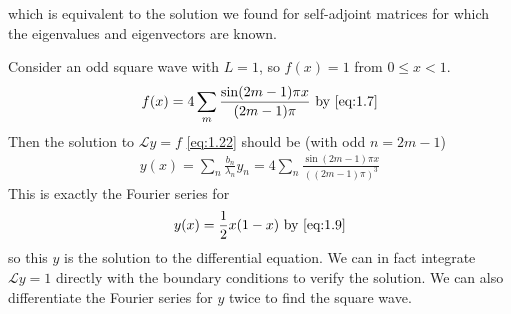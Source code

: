 which is equivalent to the solution we found for self-adjoint matrices for which the eigenvalues and eigenvectors are known.
\begin{example}
    Consider an odd square wave with $L = 1$, so $f(x) = 1$ from $0 \leq x < 1$.
    \begin{align*}
        f(x) = 4 \sum_m \frac{\sin(2m-1)\pi x}{(2m-1)\pi} \text{ by \cref{eq:1.7}}
    \end{align*}
    Then the solution to $\mathcal L y = f$ \cref{eq:1.22} should be (with odd $n = 2m-1$)
    \begin{align*}
        y(x) = \sum_n \frac{b_n}{\lambda_n} y_n = 4 \sum_n \frac{\sin (2m-1) \pi x}{((2m - 1) \pi)^3}
    \end{align*}
    This is exactly the Fourier series for
    \begin{align*}
        y(x) = \frac{1}{2}x(1-x) \text{ by \cref{eq:1.9}}
    \end{align*}
    so this $y$ is the solution to the differential equation.
    We can in fact integrate $\mathcal L y = 1$ directly with the boundary conditions to verify the solution.
    We can also differentiate the Fourier series for $y$ twice to find the square wave.
\end{example}
